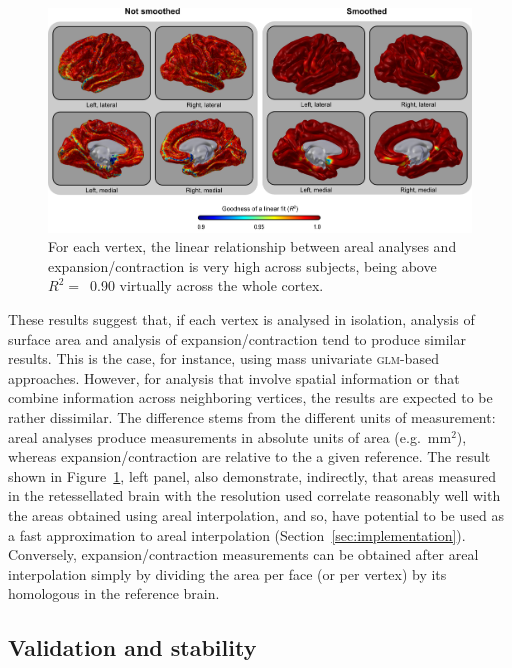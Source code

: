 \begin{figure}[!tp]  %
\centering
\includegraphics[width=14cm]{images/spatialfit.png}
\caption[Comparison with expansion/contraction methods (\textsc{iii}).]{For each vertex, the linear relationship between areal analyses and expansion/contraction is very high across subjects, being above $R^2=$~0.90 virtually across the whole cortex.}
\label{fig:spatialfit}
\end{figure}

These results suggest that, if each vertex is analysed in isolation, analysis of surface area and analysis of expansion/contraction tend to produce similar results. This is the case, for instance, using mass univariate \textsc{glm}-based approaches. However, for analysis that involve spatial information or that combine information across neighboring vertices, the results are expected to be rather dissimilar. The difference stems from the different units of measurement: areal analyses produce measurements in absolute units of area (e.g.\ mm$^2$), whereas expansion/contraction are relative to the a given reference. The result shown in Figure~\ref{fig:spatialfit}, left panel, also demonstrate, indirectly, that areas measured in the retessellated brain with the resolution used correlate reasonably well with the areas obtained using areal interpolation, and so, have potential to be used as a fast approximation to areal interpolation (Section~\ref{sec:implementation}). Conversely, expansion/contraction measurements can be obtained after areal interpolation simply by dividing the area per face (or per vertex) by its homologous in the reference brain.

\subsection{Validation and stability}

